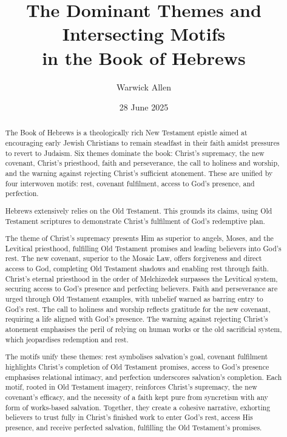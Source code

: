\documentclass[12pt]{article}
\title{The Dominant Themes and Intersecting Motifs \\ in the Book of Hebrews}
\author{Warwick Allen}
\date{28 June 2025}
\begin{document}
\maketitle

\begin{abstract}
The Book of Hebrews is a theologically rich New Testament epistle aimed at
encouraging early Jewish Christians to remain steadfast in their faith amidst
pressures to revert to Judaism. Six themes dominate the book: Christ’s
supremacy, the new covenant, Christ’s priesthood, faith and perseverance, the
call to holiness and worship, and the warning against rejecting Christ’s
sufficient atonement. These are unified by four interwoven motifs: rest,
covenant fulfilment, access to God’s presence, and perfection.

Hebrews extensively relies on the Old Testament.
This grounds its claims, using Old Testament
scriptures to demonstrate Christ’s fulfilment of God’s redemptive plan.

The theme of Christ’s supremacy presents Him as superior to angels, Moses, and
the Levitical priesthood, fulfilling Old Testament promises and leading
believers into God’s rest. The new covenant, superior to the Mosaic Law, offers
forgiveness and direct access to God, completing Old Testament shadows and
enabling rest through faith. Christ’s eternal priesthood in the order of
Melchizedek surpasses the Levitical system, securing access to God’s presence
and perfecting believers. Faith and perseverance are urged through Old
Testament examples, with unbelief warned as barring entry to God’s rest. The
call to holiness and worship reflects gratitude for the new covenant, requiring
a life aligned with God’s presence. The warning against rejecting Christ’s
atonement emphasises the peril of relying on human works or the old sacrificial
system, which jeopardises redemption and rest.

The motifs unify these themes: rest symbolises salvation’s goal, covenant
fulfilment highlights Christ’s completion of Old Testament promises, access to
God’s presence emphasises relational intimacy, and perfection underscores
salvation’s completion. Each motif, rooted in Old Testament imagery, reinforces
Christ’s supremacy, the new covenant’s efficacy, and the necessity of a faith
kept pure from syncretism with any form of works-based salvation. Together, they
create a cohesive narrative, exhorting believers to trust fully in Christ’s
finished work to enter God’s rest, access His presence, and receive perfected
salvation, fulfilling the Old Testament’s promises.
\end{abstract}
\end{document}
